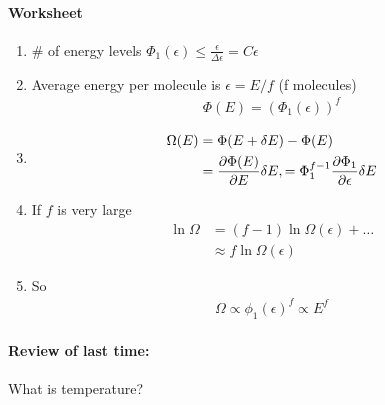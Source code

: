 \documentclass[../main.tex]{subfiles}
\begin{document}
\paragraph*{Worksheet}
\begin{enumerate}
    \item \# of energy levels $\Phi_1(\epsilon) \leq \frac{\epsilon}{\Delta \epsilon} = C \epsilon$
    \item Average energy per molecule is $\epsilon = E/f$ (f molecules)
    \begin{align*}
        \Phi(E) = (\Phi_1(\epsilon))^f
    \end{align*}
    \item \begin{align*}
        \Omega(E) &= \Phi(E + \delta E) - \Phi(E) \\
        &= \pdv{\Phi(E)}{E} \delta E, = \Phi_1^{f-1} \pdv{\Phi_1}{\epsilon} \delta E
    \end{align*}
    \item If $f$ is very large
    \begin{align*}
        \ln \Omega &= (f-1) \ln\Omega(\epsilon) + \dots \\
        &\approx f\ln\Omega(\epsilon)
    \end{align*}
    \item So
    \begin{align*}
        \Omega \propto \phi_1(\epsilon)^f \propto E^f
    \end{align*}
\end{enumerate}

\newpage
{}

\paragraph*{Review of last time:} What is temperature?
\end{document}
